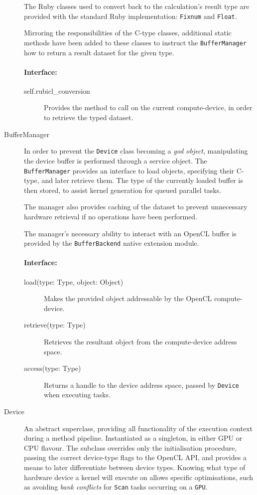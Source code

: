\begin{description}
The Ruby classes used to convert back to the calculation's result type are provided with the standard Ruby implementation: \verb|Fixnum| and \verb|Float|.

Mirroring the responsibilities of the C-type classes, additional static methods have been added to these classes to instruct the \verb|BufferManager| how to return a result dataset for the given type.
\paragraph*{Interface:}
\begin{description}
  \item[self.rubicl\_conversion] Provides the method to call on the current compute-device, in order to retrieve the typed dataset.
\end{description}

  \item[BufferManager]
In order to prevent the \verb|Device| class becoming a \emph{god object}, manipulating the device buffer is performed through a service object. The \verb|BufferManager| provides an interface to load objects, specifying their C-type, and later retrieve them. The type of the currently loaded buffer is then stored, to assist kernel generation for queued parallel tasks.

The manager also provides caching of the dataset to prevent unnecessary hardware retrieval if no operations have been performed.

The manager's necessary ability to interact with an \ac{OpenCL} buffer is provided by the \verb|BufferBackend| native extension module.
\paragraph*{Interface:}
\begin{description}
  \item[load(type: Type, object: Object)] Makes the provided object addressable by the \ac{OpenCL} compute-device.

  \item[retrieve(type: Type)] Retrieves the resultant object from the compute-device address space.

  \item[access(type: Type)] Returns a handle to the device address space, passed by \verb|Device| when executing tasks.
\end{description}

\item[Device]
  An abstract superclass, providing all functionality of the execution context during a method pipeline. Instantiated as a singleton, in either \ac{GPU} or \ac{CPU} flavour. The subclass overrides only the initialisation procedure, passing the correct device-type flags to the \ac{OpenCL} \ac{API}, and provides a means to later differentiate between device types. Knowing what type of hardware device a kernel will execute on allows specific optimisations, such as avoiding \emph{bank conflicts} for \verb|Scan| tasks occurring on a \verb|GPU|.

\end{description}

